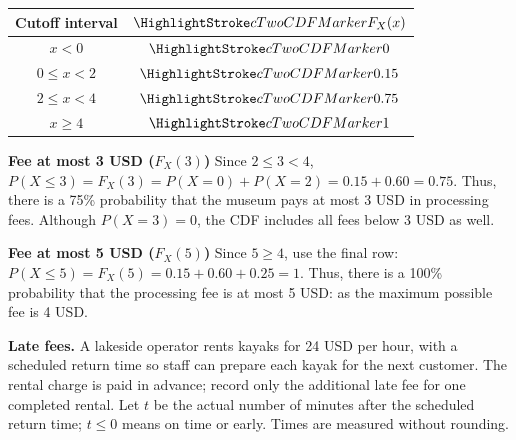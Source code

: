 \par%
\noindent%
\begin{minipage}[t]{.37\linewidth}%
  \vspace{0pt}\centering
  \begin{tabular}{cc}%
    \toprule
    Cutoff interval & $\cTwoCDFHL{F_X(x)}$ \\ \midrule
    $x<0$ & $\cTwoCDFHL{0}$ \\
    $0\leq x<2$ & $\cTwoCDFHL{0.15}$ \\
    $2\leq x<4$ & $\cTwoCDFHL{0.75}$ \\
    $x\geq 4$ & $\cTwoCDFHL{1}$ \\
    \bottomrule%
  \end{tabular}
\end{minipage}%
\hfill%
\begin{minipage}[t]{.60\linewidth}%
  \vspace{0pt}\centering
\end{minipage}%
\par


\textbf{Fee at most 3 USD ($F_X(3)$)} Since $2\leq3<4$,
$P(X\leq3)=F_X(3)=P(X=0)+P(X=2)=0.15+0.60=0.75$.
Thus, there is a 75\% probability that the museum pays at most 3 USD in processing fees. Although $P(X=3)=0$, the CDF
includes all fees below 3 USD as well.

\textbf{Fee at most 5 USD ($F_X(5)$)} Since $5\geq4$, use the final row:
$P(X\leq5)=F_X(5)=0.15+0.60+0.25=1$.
Thus, there is a 100\% probability that the processing fee is at most 5 USD: as the maximum possible fee is 4 USD.
\clearpage
\endgroup
\vfill

 \vspace{-5mm}
\textbf{Late fees.} A lakeside operator rents kayaks for 24 USD per hour, with a scheduled return time so
staff can prepare each kayak for the next customer. The rental charge is paid in advance; record only the
additional late fee for one completed rental. Let $t$ be the actual number of minutes after the scheduled
return time; $t\leq0$ means on time or early. Times are measured without rounding.


